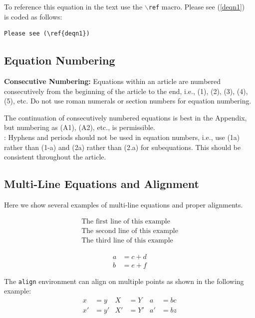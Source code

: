 \documentclass[journal,9pt]{IEEEtran}
\begin{document}
To reference this equation in the text use the $\backslash${\tt{ref}} macro.
Please see (\ref{deqn1})\\
\noindent is coded as follows:
\begin{verbatim}
Please see (\ref{deqn1})\end{verbatim}

\subsection{Equation Numbering}
{\bf{Consecutive Numbering:}} Equations within an article are numbered consecutively from the beginning of the
article to the end, i.e., (1), (2), (3), (4), (5), etc. Do not use roman numerals or section numbers for equation numbering.

 The continuation of consecutively numbered equations is best in the Appendix, but numbering
as (A1), (A2), etc., is permissible.\\

: Hyphens and periods should not be used in equation numbers, i.e., use (1a) rather than
(1-a) and (2a) rather than (2.a) for subequations. This should be consistent throughout the article.

\subsection{Multi-Line Equations and Alignment}
Here we show several examples of multi-line equations and proper alignments.

\begin{multline}
  \text{The first line of this example}\\
  \text{The second line of this example}\\
  \text{The third line of this example}
\end{multline}

\begin{align}
  a & = c+d \\
  b & = e+f
\end{align}
\noindent

The {\tt{align}} environment can align on multiple  points as shown in the following example:
\begin{align}
  x  & = y  & X  & =Y  & a  & =bc \\
  x' & = y' & X' & =Y' & a' & =bz
\end{align}
\noindent
\end{document}
